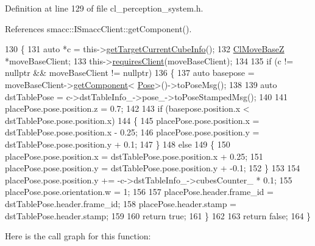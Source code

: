 Definition at line 129 of file cl\+\_\+perception\+\_\+system.\+h.



References smacc\+::\+I\+Smacc\+Client\+::get\+Component().


\begin{DoxyCode}
130             \{
131                 \textcolor{keyword}{auto} *c = this->\hyperlink{classsm__moveit__screw__loop_1_1cl__perception__system_1_1ClPerceptionSystem_ad9231b87b9592cc5c847ce1b92a75446}{getTargetCurrentCubeInfo}();
132                 \hyperlink{classcl__move__base__z_1_1ClMoveBaseZ}{ClMoveBaseZ} *moveBaseClient;
133                 this->\hyperlink{classsmacc_1_1ISmaccClient_a7a9990a2f3e35d547671188d69fee520}{requiresClient}(moveBaseClient);
134 
135                 \textcolor{keywordflow}{if} (c != \textcolor{keyword}{nullptr} && moveBaseClient != \textcolor{keyword}{nullptr})
136                 \{
137                     \textcolor{keyword}{auto} basepose = moveBaseClient->\hyperlink{classsmacc_1_1ISmaccClient_adef78db601749ca63c19e74a27cb88cc}{getComponent}<
      \hyperlink{classcl__move__base__z_1_1Pose}{Pose}>()->toPoseMsg();
138 
139                     \textcolor{keyword}{auto} dstTablePose = c->dstTableInfo\_->pose\_->toPoseStampedMsg();
140 
141                     placePose.pose.position.z = 0.7;
142 
143                     \textcolor{keywordflow}{if} (basepose.position.x < dstTablePose.pose.position.x)
144                     \{
145                         placePose.pose.position.x = dstTablePose.pose.position.x - 0.25;
146                         placePose.pose.position.y = dstTablePose.pose.position.y + 0.1;
147                     \}
148                     \textcolor{keywordflow}{else}
149                     \{
150                         placePose.pose.position.x = dstTablePose.pose.position.x + 0.25;
151                         placePose.pose.position.y = dstTablePose.pose.position.y + -0.1;
152                     \}
153 
154                     placePose.pose.position.y += -c->dstTableInfo\_->cubesCounter\_ * 0.1;
155                     placePose.pose.orientation.w = 1;
156 
157                     placePose.header.frame\_id = dstTablePose.header.frame\_id;
158                     placePose.header.stamp = dstTablePose.header.stamp;
159 
160                     \textcolor{keywordflow}{return} \textcolor{keyword}{true};
161                 \}
162 
163                 \textcolor{keywordflow}{return} \textcolor{keyword}{false};
164             \}
\end{DoxyCode}
Here is the call graph for this function\+:

